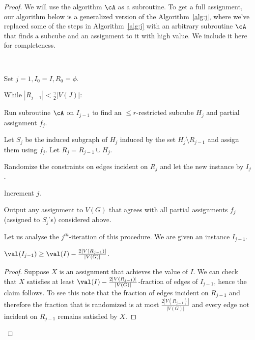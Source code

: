 \begin{proof}
We will use the algorithm $\cA$ as a subroutine. To get a full assignment, our algorithm below is a generalized version of the Algorithm~\ref{alg:j}, where we've replaced some of the steps in Algorithm~\ref{alg:j} with an arbitrary subroutine $\cA$ that finds a subcube and an assignment to it with high value. We include it here for completeness.

\begin{algorithm-thm}\label{alg:partial} ~\\ 
\begin{compactenum}
\item Set $j = 1, I_0 = I, R_0 = \phi$.
\item While $|R_{j-1}| < \frac{\gamma}{2}|V(J)|$:
\begin{compactenum}
\item Run subroutine $\cA$ on $I_{j-1}$ to find an $\leq r$-restricted subcube $H_{j}$ and partial assignment $f_j$.
\item Let $S_j$ be the induced subgraph of $H_j$ induced by the set $H_j \setminus R_{j-1}$ and assign them using $f_j$. Let $R_j = R_{j-1} \cup H_j$. 
\item Randomize the constraints on edges incident on $R_j$ and let the new instance by $I_j$. 
\item Increment $j$.
\end{compactenum}
\item Output any assignment to $V(G)$ that agrees with all partial assignments $f_j$ (assigned to $S_j$'s) considered above.
\end{compactenum}
\end{algorithm-thm}


Let us analyse the $j^{th}$-iteration of this procedure. We are given an instance $I_{j-1}$.

\begin{claim}\label{claim:it-drop}
$\val(I_{j-1}) \geq \val(I) - \frac{2|V(R_{j-1})|}{|V(G)|}$.
\end{claim}

\begin{proof}
Suppose $X$ is an assignment that achieves the value of $I$. We can check that $X$ satisfies at least $\val(I) - \frac{2|V(R_{j-1})|}{|V(G)|}$-fraction of edges of $I_{j-1}$, hence the claim follows. To see this note that the fraction of edges incident on $R_{j-1}$ and therefore the fraction that is randomized is at most $\frac{2|V(R_{j-1})|}{|V(G)|}$ and every edge not incident on $R_{j-1}$ remains satisfied by $X$.
\end{proof}


\end{proof}
